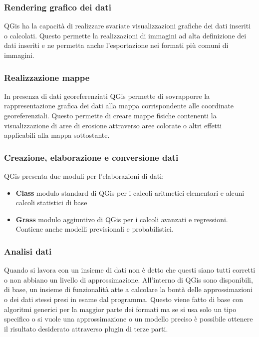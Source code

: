 \subsubsection{Rendering grafico dei dati}
QGis ha la capacità di realizzare svariate visualizzazioni grafiche dei dati inseriti o calcolati.
Questo permette la realizzazioni di immagini ad alta definizione dei dati inseriti e ne permetta anche l'esportazione nei formati più comuni di immagini.

\subsubsection{Realizzazione mappe}
In presenza di dati georeferenziati QGis permette di sovrapporre la rappresentazione grafica dei dati alla mappa corrispondente alle coordinate georeferenziali.
Questo permette di creare mappe fisiche contenenti la visualizzazione di aree di erosione attraverso aree colorate o altri effetti applicabili alla mappa sottostante.

\subsubsection{Creazione, elaborazione e conversione dati}
QGis presenta due moduli per l'elaborazioni di dati:
\begin{itemize}
	\item \textbf{Class} modulo standard di QGis per i calcoli aritmetici elementari e alcuni calcoli statistici di base
	\item \textbf{Grass} modulo aggiuntivo di QGis per i calcoli avanzati e regressioni. Contiene anche modelli previsionali e probabilistici.
\end{itemize}

\subsubsection{Analisi dati}
Quando si lavora con un insieme di dati non è detto che questi siano tutti corretti o non abbiano un livello di approssimazione.
All'interno di QGis sono disponibili, di base, un insieme di funzionalità atte a calcolare la bontà delle approssimazioni o dei dati stessi presi in esame dal programma.
Questo viene fatto di base con algoritmi generici per la maggior parte dei formati ma se si usa solo un tipo specifico o si vuole una approssimazione o un modello preciso è possibile ottenere il risultato desiderato attraverso plugin di terze parti.

